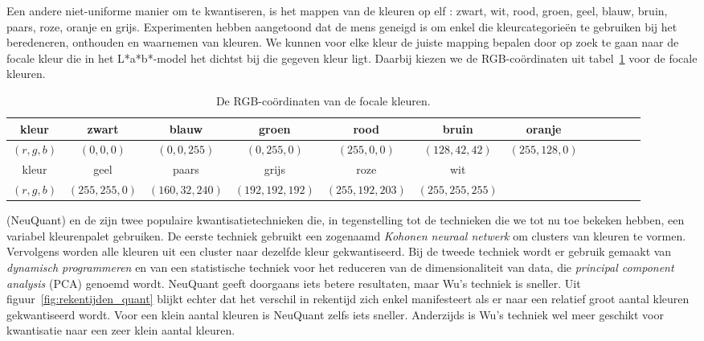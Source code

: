 Een andere niet-uniforme manier om te kwantiseren, is het mappen van de kleuren op elf 
 \cite{van_den_broek:human_color_categorization_for_cbir}: zwart, wit, rood, groen, geel, blauw, bruin, paars, roze, oranje en grijs.
Experimenten hebben aangetoond dat de mens geneigd is om enkel die kleurcategorie\"en te gebruiken bij 
het beredeneren, onthouden en waarnemen van kleuren. We kunnen voor elke kleur de juiste mapping bepalen
door op zoek te gaan naar de focale kleur die in het L*a*b*-model het dichtst bij die gegeven kleur ligt.
Daarbij kiezen we de RGB-co\"ordinaten uit tabel~\ref{tab:coords_focale_kleuren} voor de focale kleuren.

\begin{table}[bp]
\vspace{10pt}
\centering
\begin{tabular}{c|c@{ }c@{ }c@{ }c@{ }c@{ }c@{ }c@{ }c@{ }c@{ }c@{ }c}
kleur & zwart & blauw & groen & rood & bruin & oranje\\	
\hline
$(r,g,b)$ & $(0, 0, 0)$ & $(0,   0, 255)$ & $(0, 255,   0)$ & $(255,   0,   0)$ &
$(128,  42,  42)$ & $(255, 128,   0)$\vspace{8pt}\\
kleur & geel & paars & grijs & roze & wit\\	
\hline
$(r,g,b)$ & $(255, 255,   0)$ & $(160,  32, 240)$ & $(192, 192, 192)$ & $(255, 192, 203)$ & $(255, 255, 255)$
\end{tabular}
\vspace{10pt}
\caption{\label{tab:coords_focale_kleuren}De RGB-co\"ordinaten van de focale kleuren.}
\end{table}

 (NeuQuant) \cite{dekker:neuquant} en de  
\cite{wu:color_quantization_by_dynamic_programming_and_principal_analysis} zijn twee
populaire kwantisatietechnieken die, in tegenstelling tot de technieken die we 
tot nu toe bekeken hebben, een variabel kleurenpalet gebruiken. De eerste techniek gebruikt een
zogenaamd \emph{Kohonen neuraal netwerk} om clusters van kleuren te vormen. Vervolgens worden 
alle kleuren uit een cluster naar dezelfde kleur gekwantiseerd. Bij de tweede techniek 
wordt er gebruik gemaakt van \emph{dynamisch programmeren} en van een statistische techniek voor 
het reduceren van de dimensionaliteit van data, 
die \emph{principal component analysis} (PCA) genoemd wordt. 
NeuQuant geeft doorgaans iets betere resultaten, maar Wu's techniek is
sneller. Uit figuur~\ref{fig:rekentijden_quant} blijkt echter dat het verschil in rekentijd zich
enkel manifesteert als er naar een relatief groot aantal kleuren gekwantiseerd wordt. Voor een
klein aantal kleuren is NeuQuant zelfs iets sneller. Anderzijds is Wu's techniek wel meer
geschikt voor kwantisatie naar een zeer klein aantal kleuren.
 

